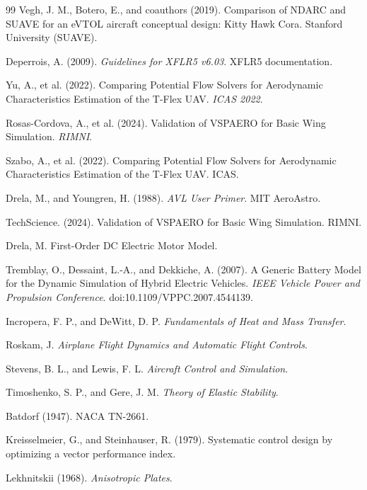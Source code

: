 \begin{thebibliography}{99}
Vegh, J. M., Botero, E., and coauthors (2019). Comparison of NDARC and SUAVE for an eVTOL aircraft conceptual design: Kitty Hawk Cora. Stanford University (SUAVE).

Deperrois, A. (2009). \textit{Guidelines for XFLR5 v6.03}. XFLR5 documentation.

Yu, A., et al. (2022). Comparing Potential Flow Solvers for Aerodynamic Characteristics Estimation of the T-Flex UAV. \textit{ICAS 2022}.

Rosas-Cordova, A., et al. (2024). Validation of VSPAERO for Basic Wing Simulation. \textit{RIMNI}.

Szabo, A., et al. (2022). Comparing Potential Flow Solvers for Aerodynamic Characteristics Estimation of the T-Flex UAV. ICAS.

Drela, M., and Youngren, H. (1988). \textit{AVL User Primer}. MIT AeroAstro.

TechScience. (2024). Validation of VSPAERO for Basic Wing Simulation. RIMNI.

Drela, M. First-Order DC Electric Motor Model.

Tremblay, O., Dessaint, L.-A., and Dekkiche, A. (2007). A Generic Battery Model for the Dynamic Simulation of Hybrid Electric Vehicles. \textit{IEEE Vehicle Power and Propulsion Conference}. doi:10.1109/VPPC.2007.4544139.

Incropera, F. P., and DeWitt, D. P. \textit{Fundamentals of Heat and Mass Transfer}.

Roskam, J. \textit{Airplane Flight Dynamics and Automatic Flight Controls}.

Stevens, B. L., and Lewis, F. L. \textit{Aircraft Control and Simulation}.

Timoshenko, S. P., and Gere, J. M. \textit{Theory of Elastic Stability}.

Batdorf (1947). NACA TN-2661.

Kreisselmeier, G., and Steinhauser, R. (1979). Systematic control design by optimizing a vector performance index.

Lekhnitskii (1968). \textit{Anisotropic Plates}.


\end{thebibliography}
